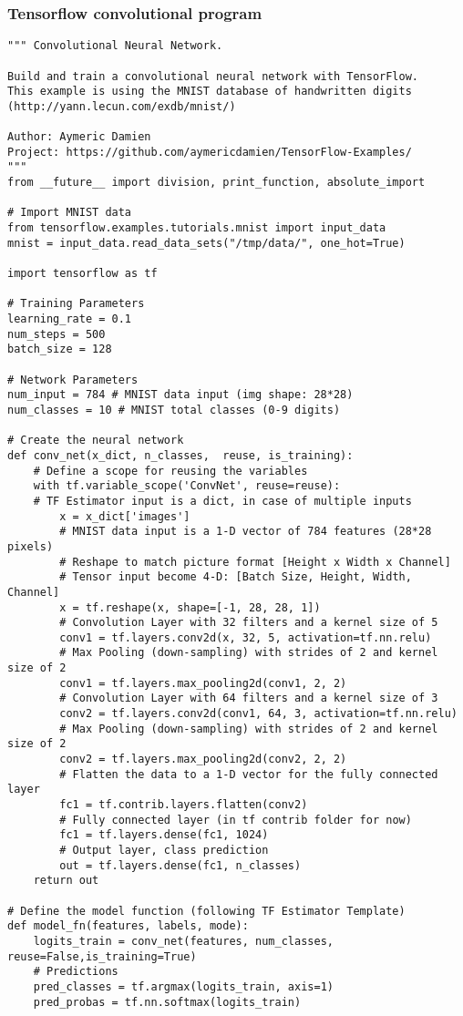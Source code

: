 \subsubsection{Tensorflow convolutional program}
\begin{verbatim}
""" Convolutional Neural Network.

Build and train a convolutional neural network with TensorFlow.
This example is using the MNIST database of handwritten digits
(http://yann.lecun.com/exdb/mnist/)

Author: Aymeric Damien
Project: https://github.com/aymericdamien/TensorFlow-Examples/
"""
from __future__ import division, print_function, absolute_import

# Import MNIST data
from tensorflow.examples.tutorials.mnist import input_data
mnist = input_data.read_data_sets("/tmp/data/", one_hot=True)

import tensorflow as tf

# Training Parameters
learning_rate = 0.1
num_steps = 500
batch_size = 128

# Network Parameters
num_input = 784 # MNIST data input (img shape: 28*28)
num_classes = 10 # MNIST total classes (0-9 digits)

# Create the neural network
def conv_net(x_dict, n_classes,  reuse, is_training):
	# Define a scope for reusing the variables
	with tf.variable_scope('ConvNet', reuse=reuse):
	# TF Estimator input is a dict, in case of multiple inputs
		x = x_dict['images']
		# MNIST data input is a 1-D vector of 784 features (28*28 pixels)
		# Reshape to match picture format [Height x Width x Channel]
		# Tensor input become 4-D: [Batch Size, Height, Width, Channel]
		x = tf.reshape(x, shape=[-1, 28, 28, 1])
		# Convolution Layer with 32 filters and a kernel size of 5
		conv1 = tf.layers.conv2d(x, 32, 5, activation=tf.nn.relu)
		# Max Pooling (down-sampling) with strides of 2 and kernel size of 2
		conv1 = tf.layers.max_pooling2d(conv1, 2, 2)
		# Convolution Layer with 64 filters and a kernel size of 3
		conv2 = tf.layers.conv2d(conv1, 64, 3, activation=tf.nn.relu)
		# Max Pooling (down-sampling) with strides of 2 and kernel size of 2
		conv2 = tf.layers.max_pooling2d(conv2, 2, 2)
		# Flatten the data to a 1-D vector for the fully connected layer
		fc1 = tf.contrib.layers.flatten(conv2)
		# Fully connected layer (in tf contrib folder for now)
		fc1 = tf.layers.dense(fc1, 1024)
		# Output layer, class prediction
		out = tf.layers.dense(fc1, n_classes)
	return out

# Define the model function (following TF Estimator Template)
def model_fn(features, labels, mode):
	logits_train = conv_net(features, num_classes, reuse=False,is_training=True)
	# Predictions
	pred_classes = tf.argmax(logits_train, axis=1)
	pred_probas = tf.nn.softmax(logits_train)


\end{verbatim}
